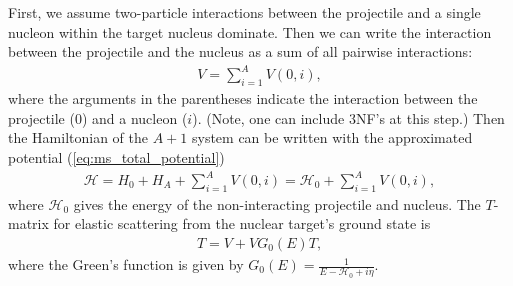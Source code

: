 \documentclass[preprintnumbers,floatfix,aps,prc,preprint,nofootinbib]{revtex4-1}
\begin{document}
First, we assume two-particle interactions between the projectile and a single nucleon within the target nucleus dominate. Then we can write the interaction between the projectile and the nucleus as a sum of all pairwise interactions:
%
\begin{eqnarray}
	\label{eq:ms_total_potential}
	V = \sum_{i=1}^A V(0, i),
\end{eqnarray}
%
where the arguments in the parentheses indicate the interaction between the projectile ($0$) and a nucleon ($i$). (Note, one can include 3NF's at this step.) Then the Hamiltonian of the $A+1$ system can be written with the approximated potential (\ref{eq:ms_total_potential})
%
\begin{eqnarray}
	\label{eq:ms_hamiltonian}
	\mathcal{H} = H_0 + H_A + \sum_{i=1}^A V(0, i) = \mathcal{H}_0 + \sum_{i=1}^A V(0, i),
\end{eqnarray}
%
where $\mathcal{H}_0$ gives the energy of the non-interacting projectile and nucleus. The $T$-matrix for elastic scattering from the nuclear target's ground state is
%
\begin{eqnarray}
	\label{eq:tmatrix}
	T = V + V G_0(E) T,
\end{eqnarray}
%
where the Green's function is given by $G_0(E) = \frac{1}{E - \mathcal{H}_0 + i \eta}$.
\\
\end{document}
